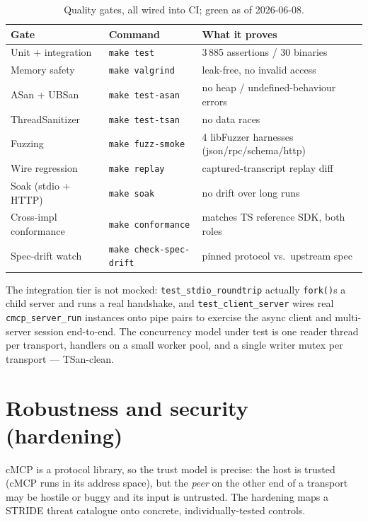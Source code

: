 \documentclass[10pt]{article}
\newcommand{\code}[1]{\texttt{\small #1}}
\begin{document}
\begin{table}[ht]
  \centering
  \caption{Quality gates, all wired into CI; green as of 2026-06-08.}
  \begin{tabular}{l l l}
    \toprule
    Gate & Command & What it proves \\
    \midrule
    Unit + integration   & \code{make test}            & 3\,885 assertions / 30 binaries \\
    Memory safety        & \code{make valgrind}        & leak-free, no invalid access \\
    ASan + UBSan         & \code{make test-asan}       & no heap / undefined-behaviour errors \\
    ThreadSanitizer      & \code{make test-tsan}       & no data races \\
    Fuzzing              & \code{make fuzz-smoke}      & 4 libFuzzer harnesses (json/rpc/schema/http) \\
    Wire regression      & \code{make replay}          & captured-transcript replay diff \\
    Soak (stdio + HTTP)  & \code{make soak}            & no drift over long runs \\
    Cross-impl conformance & \code{make conformance}   & matches TS reference SDK, both roles \\
    Spec-drift watch     & \code{make check-spec-drift}& pinned protocol vs.\ upstream spec \\
    \bottomrule
  \end{tabular}
\end{table}

The integration tier is not mocked: \code{test\_stdio\_roundtrip} actually
\code{fork()}s a child server and runs a real handshake, and
\code{test\_client\_server} wires real \code{cmcp\_server\_run} instances onto
pipe pairs to exercise the async client and multi-server session end-to-end.
The concurrency model under test is one reader thread per transport, handlers
on a small worker pool, and a single writer mutex per transport --- TSan-clean.

\section{Robustness and security (hardening)}

cMCP is a protocol library, so the trust model is precise: the host is trusted
(cMCP runs in its address space), but the \emph{peer} on the other end of a
transport may be hostile or buggy and its input is untrusted. The hardening
maps a STRIDE threat catalogue onto concrete, individually-tested controls.
\end{document}
